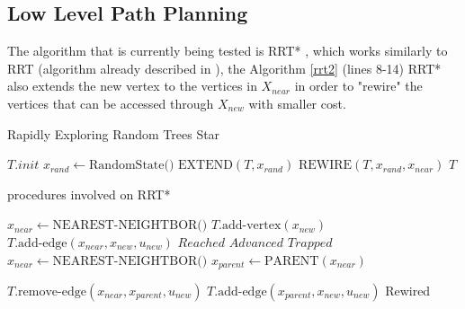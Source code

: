 \documentclass{llncs}
\begin{document}
\subsection{Low Level Path Planning}
The algorithm that is currently being tested is RRT* \cite{RRT}, which works similarly to RRT (algorithm already described in \cite{ais2018tdp}), the Algorithm \ref{rrt2} (lines 8-14) RRT* also extends the new vertex to the vertices in $X_{near}$ in order to "rewire" the vertices that can be accessed through $X_{new}$ with smaller cost.

\begin{algorithm}[h]
\caption{Rapidly Exploring Random Trees Star}
\begin{algorithmic}[1]
        \State $T.init$ 
            \State $x_{rand} \gets \text{RandomState()}$
            \State $\text{EXTEND}(T,x_{rand})$
        \vspace{0.1em}
        \EndFor
            \State $\text{REWIRE}(T,x_{rand},x_{near})$
        \vspace{0.1em}
        \EndFor
        \Return $T$
    \EndProcedure
\end{algorithmic}
\label{rrt}
\end{algorithm}

\begin{algorithm}[h]
\caption{procedures involved on RRT*}
\begin{algorithmic}[1]
        \State $x_{near} \gets \text{NEAREST-NEIGHTBOR()}$
            \State $T.\text{add-vertex}(x_{new})$
            \State $T.\text{add-edge}(x_{near},x_{new},u_{new})$
                \Return $Reached$
            \Else{}
                \Return $Advanced$
            \EndIf
        \vspace{0.4em}
        \EndIf
        \Return $Trapped$
    \EndProcedure
        \State $x_{near} \gets \text{NEAREST-NEIGHTBOR()}$
        \State $x_{parent} \gets \text{PARENT} (x_{near})$
        
            \State $T.\text{remove-edge}(x_{near},x_{parent},u_{new})$
            \State $T.\text{add-edge}(x_{parent},x_{new},u_{new})$
        \EndIf
        \Return Rewired
    \EndProcedure
\end{algorithmic}
\label{rrt2}
\end{algorithm}
\end{document}
